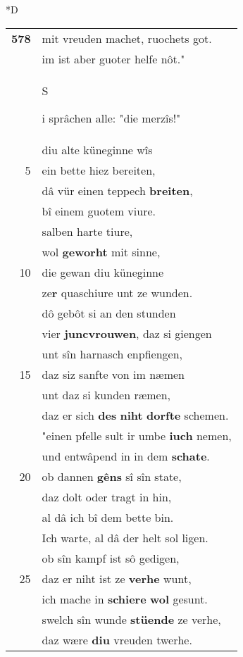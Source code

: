 \documentclass[8pt,a4paper,notitlepage]{article}
\begin{document}
\begin{table}[ht]
\begin{minipage}[t]{0.5\linewidth}
\small
\begin{center}*D
\end{center}
\begin{tabular}{rl}
\textbf{578} & mit vreuden machet, ruochets got.\\ 
 & im ist aber guoter helfe nôt."\\ 
 & \begin{large}S\end{large}i sprâchen alle: "die merzîs!"\\ 
 & diu alte küneginne wîs\\ 
5 & ein bette hiez bereiten,\\ 
 & dâ vür einen teppech \textbf{breiten},\\ 
 & bî einem guotem viure.\\ 
 & salben harte tiure,\\ 
 & wol \textbf{geworht} mit sinne,\\ 
10 & die gewan diu küneginne\\ 
 & ze\textbf{r} quaschiure unt ze wunden.\\ 
 & dô gebôt si an den stunden\\ 
 & vier \textbf{juncvrouwen}, daz si giengen\\ 
 & unt sîn harnasch enpfiengen,\\ 
15 & daz siz sanfte von im næmen\\ 
 & unt daz si kunden ræmen,\\ 
 & daz er sich \textbf{des} \textbf{niht} \textbf{dorfte} schemen.\\ 
 & "einen pfelle sult ir umbe \textbf{iuch} nemen,\\ 
 & und entwâpend in in dem \textbf{schate}.\\ 
20 & ob dannen \textbf{gêns} sî sîn state,\\ 
 & daz dolt oder tragt in hin,\\ 
 & al dâ ich bî dem bette bin.\\ 
 & Ich warte, al dâ der helt sol ligen.\\ 
 & ob sîn kampf ist sô gedigen,\\ 
25 & daz er niht ist ze \textbf{verhe} wunt,\\ 
 & ich mache in \textbf{schiere} \textbf{wol} gesunt.\\ 
 & swelch sîn wunde \textbf{stüende} ze verhe,\\ 
 & daz wære \textbf{diu} vreuden twerhe.\\ 

\end{tabular}
\end{minipage}
\end{table}
\end{document}
